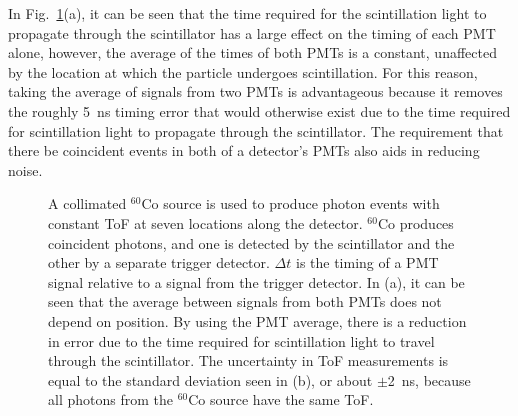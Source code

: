 \documentclass[%
 reprint,
 amsmath,amssymb,
 aps,
 nofootinbib
]{revtex4-1}
\begin{document}
In Fig.~\ref{fig:ConstPMTAvg}(a), it can be seen that the time required for the scintillation light to propagate through the scintillator has a large effect on the timing of each PMT alone, however, the average of the times of both PMTs is a constant, unaffected by the location at which the particle undergoes scintillation.
For this reason, taking the average of signals from two PMTs is advantageous because it removes the roughly 5~ns timing error that would otherwise exist due to the time required for scintillation light to propagate through the scintillator.
The requirement that there be coincident events in both of a detector's PMTs also aids in reducing noise.
\begin{figure}[h]
\centering
{}

\caption{A collimated $^{60}$Co source is used to produce photon events with constant ToF at seven locations along the detector.
$^{60}$Co produces coincident photons, and one is detected by the scintillator and the other by a separate trigger detector.
 $\Delta t$ is the timing of a PMT signal relative to a signal from the trigger detector. 
 In (a), it can be seen that the average between signals from both PMTs does not depend on position.
By using the PMT average, there is a reduction in error due to the time required for scintillation light to travel through the scintillator.
The uncertainty in ToF measurements is equal to the standard deviation seen in (b), or about $\pm$2~ns, because all photons from the $^{60}$Co source have the same ToF.}
\label{fig:ConstPMTAvg}
\end{figure}
\end{document}
